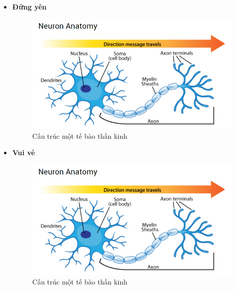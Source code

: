 \documentclass[12pt,a4paper,oneside]{book}
\numberwithin{equation}{chapter} %
\numberwithin{figure}{chapter} %
\numberwithin{table}{chapter} %
\begin{document}
\begin{itemize}
\item \textbf{Đứng yên}
\FloatBarrier
\begin{figure}[htp]
\begin{center}
\includegraphics[scale=0.8]{chap2/c2_figs/neuron.png}
\end{center}
\caption{Cấu trúc một tế bào thần kinh}
\label{fig:neuronsinhhoc}
\end{figure}
\FloatBarrier

\item \textbf{Vui vẻ}
\FloatBarrier
\begin{figure}[htp]
\begin{center}
\includegraphics[scale=0.8]{chap2/c2_figs/neuron.png}
\end{center}
\caption{Cấu trúc một tế bào thần kinh}
\label{fig:neuronsinhhoc}
\end{figure}
\FloatBarrier


\end{itemize}
\end{document}
